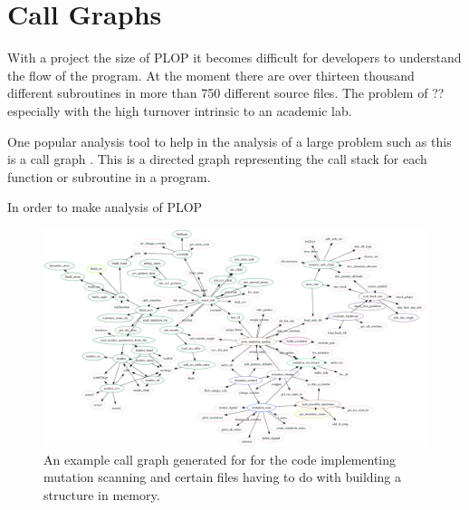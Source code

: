 \section{Call Graphs}
\label{section:unsorted/call_graphs}

With a project the size of PLOP it becomes difficult for developers to understand the flow of the program.
At the moment there are over thirteen thousand different subroutines in more than 750 different source files.
The problem of ?? especially with the high turnover intrinsic to an academic lab.


One popular analysis tool to help in the analysis of a large problem such as this is a call graph \cite{graham1982gprof}.
This is a directed graph representing the call stack for each function or subroutine in a program.

In order to make analysis of PLOP 


\begin{figure}[h]
    \centering
    \includegraphics[width=1.0\textwidth,height=0.9\textheight,keepaspectratio]{figures/plop_connected_sfdp.png}
    \caption{An example call graph generated for for the code implementing mutation scanning and certain files having to do with building a structure in memory.}
    \label{figure:mutation_call_graph}
\end{figure}

